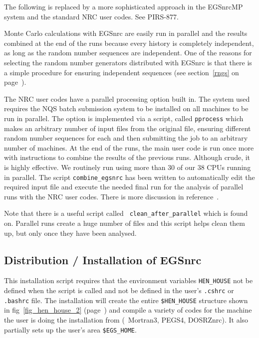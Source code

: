 The following is replaced by a more sophisticated approach in the EGSnrcMP
system and the standard NRC user codes. See PIRS-877\cite{Ka03}.

Monte Carlo calculations with EGSnrc are easily run in parallel and the
results combined at the end of the runs because every history is completely
independent, as long as the random number sequences are independent. One of
the reasons for selecting the random number generators distributed with
EGSnrc is that there is a simple procedure for ensuring independent
sequences (see section~\ref{rngs} on page~\pageref{rngs}).  

The NRC user codes\cite{Ro00} have a parallel processing option built in.
The system used requires the NQS batch submission system to be installed on
all machines to be run in parallel. The option is implemented via a script,
called {\tt pprocess} which makes an arbitrary number of input files from
the original file, ensuring different random number sequences for each and
then submitting the job to an arbitrary number of machines.  At the end of
the runs, the main user code is run once more with instructions to combine
the results of the previous runs.  Although crude, it is highly effective.
We routinely run using more than 30 of our 38 CPUs running in parallel.
The script {\tt combine\_egsnrc} has been written to automatically edit the
required input file and execute the needed final run for the analysis of
parallel runs with the NRC user codes.
There is more discussion in reference~\cite{Ro00}.

Note that there is a useful script called {\tt
clean\_after\_parallel} which is found on.
Parallel runs create a huge number of files and this script helps clean
them up, but only once they have been analysed.


\subsection{Distribution / Installation of EGSnrc}
\label{install}


This installation script requires that the environment variables
\verb+HEN_HOUSE+ not be defined when the script is called and not be 
defined in the user's {\tt .cshrc} or {\tt .bashrc} file. The installation will create
the entire \verb+$HEN_HOUSE+ structure shown in
fig~\ref{fig_hen_house_2} (page~\pageref{fig_hen_house_2})
and compile a variety of codes for the machine
the user is doing the installation from (\viz\ Mortran3,
PEGS4, DOSRZnrc).  It also partially sets up the user's area
\verb+$EGS_HOME+. 

